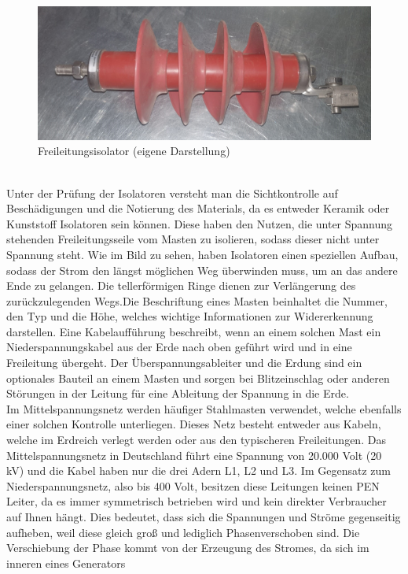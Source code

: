 \begin{figure}[hbt]
    \centering
    \includegraphics[width=0.98\linewidth]{images/Isolator}
    \caption[Isolator]{Freileitungsisolator (eigene Darstellung)}
    \label{fig:Isolator}
\end{figure}
\\Unter der Prüfung der Isolatoren versteht man die Sichtkontrolle auf Beschädigungen und die Notierung des Materials, da es entweder Keramik oder Kunststoff 
Isolatoren sein können. Diese haben den Nutzen, die unter Spannung stehenden Freileitungsseile vom Masten zu isolieren, sodass dieser nicht unter Spannung 
steht. Wie im Bild zu sehen, haben Isolatoren einen speziellen Aufbau, sodass der Strom den längst möglichen Weg überwinden muss, um an das andere Ende zu 
gelangen. Die tellerförmigen Ringe dienen zur Verlängerung des zurückzulegenden Wegs.Die Beschriftung eines Masten beinhaltet die Nummer, den Typ und die 
Höhe, welches wichtige Informationen zur Widererkennung darstellen. Eine Kabelaufführung beschreibt, wenn an einem solchen Mast ein Niederspannungskabel 
aus der Erde nach oben geführt wird und in eine Freileitung übergeht. Der Überspannungsableiter und die Erdung sind ein optionales Bauteil an einem Masten 
und sorgen bei Blitzeinschlag oder anderen Störungen in der Leitung für eine Ableitung der Spannung in die Erde.
\\
Im Mittelspannungsnetz werden häufiger Stahlmasten verwendet, welche ebenfalls einer solchen Kontrolle unterliegen. Dieses Netz besteht entweder aus Kabeln, 
welche im Erdreich verlegt werden oder aus den typischeren Freileitungen. Das Mittelspannungsnetz in Deutschland führt eine Spannung von 20.000 Volt (20 kV) 
und die Kabel haben nur die drei Adern L1, L2 und L3. Im Gegensatz zum Niederspannungsnetz, also bis 400 Volt, besitzen diese Leitungen keinen PEN Leiter, da 
es immer symmetrisch betrieben wird und kein direkter Verbraucher auf Ihnen hängt. Dies bedeutet, dass sich die Spannungen und Ströme gegenseitig aufheben, 
weil diese gleich groß und lediglich Phasenverschoben sind. Die Verschiebung der Phase kommt von der Erzeugung des Stromes, da sich im inneren eines Generators 

